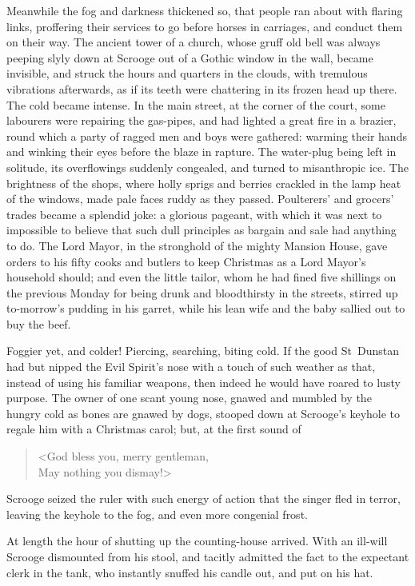 Meanwhile the fog and darkness thickened so, that people ran about with flaring links, proffering their services to go before hors\-es in carriages, and conduct them on their way. The ancient tower of a church, whose gruff old bell was always peeping slyly down at Scrooge out of a Gothic window in the wall, became invisible, and struck the hours and quarters in the clouds, with tremulous vibrations afterwards, as if its teeth were chattering in its frozen head up there. The cold became intense. In the main street, at the corner of the court, some labourers were repairing the gas-pipes, and had lighted a great fire in a brazier, round which a party of ragged men and boys were gathered: warming their hands and winking their eyes before the blaze in rapture. The water-plug being left in solitude, its overflowings suddenly congealed, and turned to misanthropic ice. The brightness of the shops, where holly sprigs and berries crackled in the lamp heat of the windows, made pale faces ruddy as they passed. Poulterers' and grocers' trades became a splendid joke: a glorious pageant, with which it was next to impossible to believe that such dull principles as bargain and sale had anything to do. The Lord Mayor, in the stronghold of the mighty Mansion House, gave orders to his fifty cooks and butlers to keep Christmas as a Lord Mayor's household should; and even the little tailor, whom he had fined five shillings on the previous Monday for being drunk and bloodthirsty in the streets, stirred up to-morrow's pudding in his garret, while his lean wife and the baby sallied out to buy the beef.

Foggier yet, and colder! Piercing, searching, biting cold. If the good St~Dunstan had but nipped the Evil Spirit's nose with a touch of such weather as that, instead of using his familiar weapons, then indeed he would have roared to lusty purpose. The owner of one scant young nose, gnawed and mumbled by the hungry cold as bones are gnawed by dogs, stooped down at Scrooge's keyhole to regale him with a Christmas carol; but, at the first sound of 

\blockquote{<God bless you, merry gentleman,\\
May nothing you dismay!>}

\noindent Scrooge seized the ruler with such energy of action that the singer fled in terror, leaving the keyhole to the fog, and even more congenial frost.

At length the hour of shutting up the counting-house arrived. With an ill-will Scrooge dismounted from his stool, and tacitly admitted the fact to the expectant clerk in the tank, who instantly snuffed his candle out, and put on his hat.

